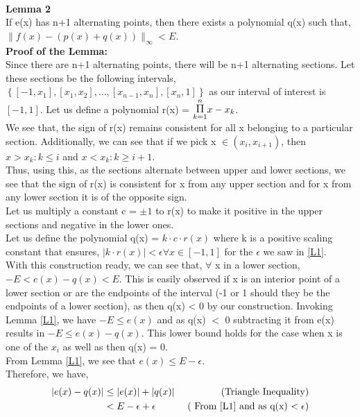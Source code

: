 \documentclass[letterpaper]{exam}
\begin{document}
\begin{questions}
\begin{solution}
\\
\textbf{Lemma 2}\label{L2}\\
If e(x) has n+1 alternating points, then there exists a polynomial q(x) such that, $\|f(x) - (p(x)+q(x))\|_{\infty} < E$.
\\
\textbf{Proof of the Lemma:}\\
Since there are n+1 alternating points, there will be n+1 alternating sections. Let these sections be the following intervals, $\left\{[-1,x_1],[x_1,x_2],\ldots, [x_{n-1},x_{n}],[x_{n},1]\right\}$ as our interval of interest is $[-1,1]$. Let us define a polynomial r(x) = $\overset{n}{\underset{k=1}{\mathlarger{\mathlarger{\Pi}}}} x -x_{k}$.\\
We see that, the sign of r(x) remains consistent for all x belonging to a particular section. Additionally, we can see that if we pick x $\in (x_{i},x_{i+1})$, then $x > x_{k} : k \leq i$ and $x < x_{k} : k \geq i+1 $. \\
Thus, using this, as the sections alternate between upper and lower sections, we see that the sign of r(x) is consistent for x from any upper section and for x from any lower section it is of the opposite sign. \\
Let us multiply a constant c = $\pm 1$ to r(x) to make it positive in the upper sections and negative in the lower ones.\\
Let us define the polynomial q(x) = $k\cdot c\cdot r(x)$ where k is a positive scaling constant that ensures, $\left|k\cdot r(x)\right| < \epsilon \forall x \in [-1,1]$ for the $\epsilon$ we saw in \ref{L1}.\\
With this construction ready, we can see that, $\forall$ x in a lower section, $-E < e(x) - q(x) < E$. This is easily observed if x is an interior point of a lower section or are the endpoints of the interval (-1 or 1 should they be the endpoints of a lower section), as then q(x) < 0 by our construction. Invoking Lemma \ref{L1}, we have $-E \leq e(x) $ and as q(x) $<$ 0 subtracting it from e(x) results in $-E \leq e(x) -  q(x)$. This lower bound holds for the case when x is one of the $x_{i}$ as well as then q(x) = 0.\\
From Lemma \ref{L1}, we see that $e(x) \leq E - \epsilon$.\\
Therefore, we have,
\begin{align*}
\left|e(x) - q(x)\right| &\leq \left|e(x)\right| + \left|q(x)\right| & \mbox{ (Triangle Inequality)}\\
& <
E-\epsilon + \epsilon &\mbox{ ( From \ref{L1} and as q(x) $< \epsilon$)}

\end{align*}
\end{solution}
\end{questions}
\end{document}
